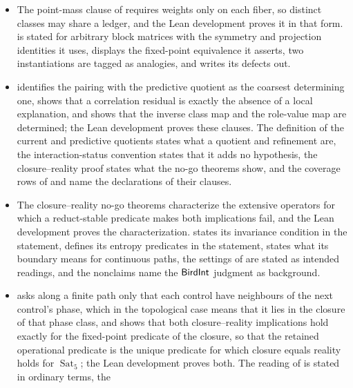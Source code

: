 \begin{itemize}
  failure of its implication, the vocabulary defines a closure space, the
  reading path lists the arguments that are not descent arguments, and the
  Reflexive Nonclosure law states which of its conclusions are premises.
\item The point-mass clause of  requires weights only on each
  fiber, so distinct classes may share a ledger, and the Lean development proves
  it in that form.  is stated for arbitrary block matrices with the
  symmetry and projection identities it uses,  displays the
  fixed-point equivalence it asserts, two instantiations are tagged as
  analogies, and  writes its defects out.
\item {} identifies the pairing with the predictive quotient as
  the coarsest determining one,  shows that a correlation
  residual is exactly the absence of a local explanation, and 
  shows that the inverse class map and the role-value map are determined; the
  Lean development proves these clauses. The definition of the current and
  predictive quotients states what a quotient and refinement are, the
  interaction-status convention states that it adds no hypothesis, the
  closure--reality proof states what the no-go theorems show, and the coverage
  rows of  and  name the declarations of their clauses.
\item The closure--reality no-go theorems characterize the extensive operators
  for which a reduct-stable predicate makes both implications fail, and the Lean
  development proves the characterization.  states its invariance
  condition in the statement,  defines its entropy predicates in
  the statement,  states what its boundary means for continuous
  paths, the settings of  are stated as intended
  readings, and the nonclaims name the \(\mathsf{BirdInt}\) judgment as background.
\item {} asks along a finite path only that each control have
  neighbours of the next control's phase, which in the topological case means
  that it lies in the closure of that phase class, and  shows
  that both closure--reality implications hold exactly for the fixed-point
  predicate of the closure, so that the retained operational predicate is the
  unique predicate for which closure equals reality holds for
  \(\operatorname{Sat}_5\); the Lean development
  proves both. The reading of  is stated in ordinary terms, the

\end{itemize}
